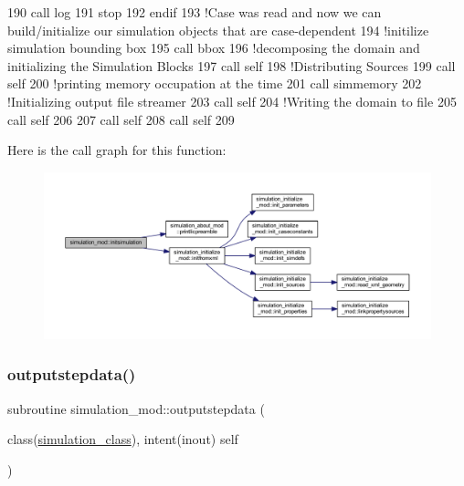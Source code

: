 \begin{DoxyCode}
190         \textcolor{keyword}{call }log%
191         stop
192 \textcolor{keywordflow}{    endif}
193     \textcolor{comment}{!Case was read and now we can build/initialize our simulation objects that are case-dependent}
194     \textcolor{comment}{!initilize simulation bounding box}
195     \textcolor{keyword}{call }bbox%
196     \textcolor{comment}{!decomposing the domain and initializing the Simulation Blocks}
197     \textcolor{keyword}{call }self%
198     \textcolor{comment}{!Distributing Sources}
199     \textcolor{keyword}{call }self%
200     \textcolor{comment}{!printing memory occupation at the time}
201     \textcolor{keyword}{call }simmemory%
202     \textcolor{comment}{!Initializing output file streamer}
203     \textcolor{keyword}{call }self%
204     \textcolor{comment}{!Writing the domain to file}
205     \textcolor{keyword}{call }self%
206 
207     \textcolor{keyword}{call }self%
208     \textcolor{keyword}{call }self%
209 
\end{DoxyCode}
Here is the call graph for this function\+:\nopagebreak
\begin{figure}[H]
\begin{center}
\leavevmode
\includegraphics[width=350pt]{namespacesimulation__mod_aedbba2bb458cbcd7eb93938a5f7b5940_cgraph}
\end{center}
\end{figure}
\mbox{\label{namespacesimulation__mod_a5735e9ecb39f15061f3d766b0de7809d}} 
\subsubsection{\texorpdfstring{outputstepdata()}{outputstepdata()}}
{\footnotesize\ttfamily subroutine simulation\+\_\+mod\+::outputstepdata (\begin{DoxyParamCaption}\item[{class(\mbox{\hyperlink{structsimulation__mod_1_1simulation__class}{simulation\+\_\+class}}), intent(inout)}]{self }\end{DoxyParamCaption})\hspace{0.3cm}{\ttfamily [private]}}



